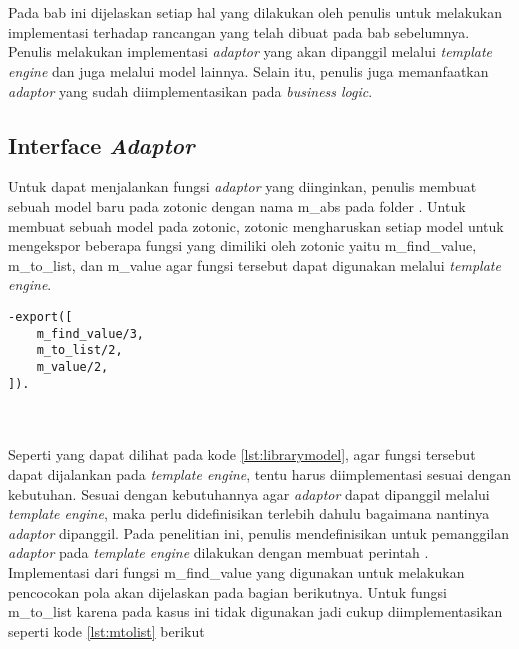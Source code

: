 \chapter{\babEmpat}

Pada bab ini dijelaskan setiap hal yang dilakukan oleh penulis untuk melakukan implementasi terhadap rancangan yang telah dibuat pada bab sebelumnya. Penulis melakukan implementasi \textit{adaptor} yang akan dipanggil melalui \textit{template engine} dan juga melalui model lainnya. Selain itu, penulis juga memanfaatkan \textit{adaptor} yang sudah diimplementasikan pada \textit{business logic}.

\section{Interface \textit{Adaptor}}

Untuk dapat menjalankan fungsi \textit{adaptor} yang diinginkan, penulis membuat sebuah model baru pada zotonic dengan nama m\_abs pada folder . Untuk membuat sebuah model pada zotonic, zotonic mengharuskan setiap model untuk mengekspor beberapa fungsi yang dimiliki oleh zotonic yaitu m\_find\_value, m\_to\_list, dan m\_value agar fungsi tersebut dapat digunakan melalui \textit{template engine}.

\begin{minipage}{\linewidth}
\begin{lstlisting}[caption={Fungsi yang harus diekspor untuk model},label={lst:librarymodel}]
-export([
	m_find_value/3,
	m_to_list/2,
	m_value/2,
]).
\end{lstlisting}
\end{minipage}\\\\

Seperti yang dapat dilihat pada kode \ref{lst:librarymodel}, agar fungsi tersebut dapat dijalankan pada \textit{template engine}, tentu harus diimplementasi sesuai dengan kebutuhan. Sesuai dengan kebutuhannya agar \textit{adaptor} dapat dipanggil melalui \textit{template engine}, maka perlu didefinisikan terlebih dahulu bagaimana nantinya \textit{adaptor} dipanggil. Pada penelitian ini, penulis mendefinisikan untuk pemanggilan \textit{adaptor} pada \textit{template engine} dilakukan dengan membuat perintah . Implementasi dari fungsi m\_find\_value yang digunakan untuk melakukan pencocokan pola akan dijelaskan pada bagian berikutnya. Untuk fungsi m\_to\_list karena pada kasus ini tidak digunakan jadi cukup diimplementasikan seperti kode \ref{lst:mtolist} berikut


